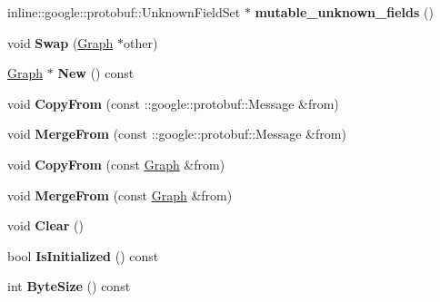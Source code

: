 \begin{DoxyCompactItemize}
\item 
\hypertarget{classgraph_1_1Graph_a93081ad4e0af2767c6f57004f5f59dc2}{
inline::google::protobuf::UnknownFieldSet $\ast$ {\bfseries mutable\_\-unknown\_\-fields} ()}
\label{classgraph_1_1Graph_a93081ad4e0af2767c6f57004f5f59dc2}

\item 
\hypertarget{classgraph_1_1Graph_a8e3853558c7080802e9362e869206156}{
void {\bfseries Swap} (\hyperlink{classgraph_1_1Graph}{Graph} $\ast$other)}
\label{classgraph_1_1Graph_a8e3853558c7080802e9362e869206156}

\item 
\hypertarget{classgraph_1_1Graph_a812a4848569ca342a12b6b7a824b4118}{
\hyperlink{classgraph_1_1Graph}{Graph} $\ast$ {\bfseries New} () const }
\label{classgraph_1_1Graph_a812a4848569ca342a12b6b7a824b4118}

\item 
\hypertarget{classgraph_1_1Graph_ad8df9792d5748b48235e04e64abf84fd}{
void {\bfseries CopyFrom} (const ::google::protobuf::Message \&from)}
\label{classgraph_1_1Graph_ad8df9792d5748b48235e04e64abf84fd}

\item 
\hypertarget{classgraph_1_1Graph_ab52f15c185ebf734246297add1064b4a}{
void {\bfseries MergeFrom} (const ::google::protobuf::Message \&from)}
\label{classgraph_1_1Graph_ab52f15c185ebf734246297add1064b4a}

\item 
\hypertarget{classgraph_1_1Graph_adea321f8fe4c18ea4d2364c8b8dd54df}{
void {\bfseries CopyFrom} (const \hyperlink{classgraph_1_1Graph}{Graph} \&from)}
\label{classgraph_1_1Graph_adea321f8fe4c18ea4d2364c8b8dd54df}

\item 
\hypertarget{classgraph_1_1Graph_a918dc2343415dd9b7d0deb2c307bfb9d}{
void {\bfseries MergeFrom} (const \hyperlink{classgraph_1_1Graph}{Graph} \&from)}
\label{classgraph_1_1Graph_a918dc2343415dd9b7d0deb2c307bfb9d}

\item 
\hypertarget{classgraph_1_1Graph_a13680e6719e42aa3ebedfeb61ff06014}{
void {\bfseries Clear} ()}
\label{classgraph_1_1Graph_a13680e6719e42aa3ebedfeb61ff06014}

\item 
\hypertarget{classgraph_1_1Graph_ac91ebe6fc014af3707afd28a01bf30cc}{
bool {\bfseries IsInitialized} () const }
\label{classgraph_1_1Graph_ac91ebe6fc014af3707afd28a01bf30cc}

\item 
\hypertarget{classgraph_1_1Graph_ada721f70b6221bd45c0619de513bc138}{
int {\bfseries ByteSize} () const }
\label{classgraph_1_1Graph_ada721f70b6221bd45c0619de513bc138}


\end{DoxyCompactItemize}
